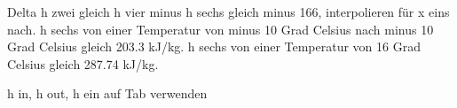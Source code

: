 Delta h zwei gleich h vier minus h sechs gleich minus 166, interpolieren für x eins nach. h sechs von einer Temperatur von minus 10 Grad Celsius nach minus 10 Grad Celsius gleich 203.3 kJ/kg. h sechs von einer Temperatur von 16 Grad Celsius gleich 287.74 kJ/kg.

h in, h out, h ein auf Tab verwenden